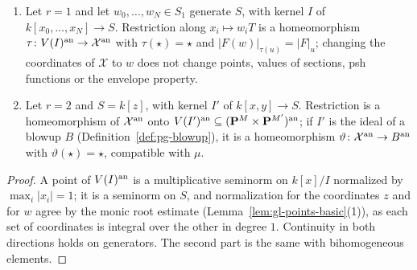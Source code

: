 \begin{lemma}\label{lem:gl-bridge-points}
\leanok
{}
\begin{enumerate}
\item Let $r=1$ and let $w_0,\dots,w_N\in S_1$ generate $S$, with kernel $I$ of $k[x_0,\dots,x_N]\to S$. Restriction along $x_i\mapsto w_iT$ is a
homeomorphism $\tau\colon V(I)^{\mathrm{an}}\to\mathcal X^{\mathrm{an}}$ with $\tau(\star)=\star$ and $|F(w)|_{\tau(u)}=|F|_u$; changing the coordinates of $\mathcal X$ to
$w$ does not change points, values of sections, psh functions or the envelope property.
\item Let $r=2$ and $S=k[z]$, with kernel $I'$ of $k[x,y]\to S$. Restriction is a homeomorphism of $\mathcal X^{\mathrm{an}}$ onto $V(I')^{\mathrm{an}}\subseteq
(\mathbf{P}^M\times\mathbf{P}^{M'})^{\mathrm{an}}$; if $I'$ is the ideal of a blowup $B$ (Definition~\ref{def:pg-blowup}), it is a homeomorphism $\vartheta\colon
\mathcal X^{\mathrm{an}}\to B^{\mathrm{an}}$ with $\vartheta(\star)=\star$, compatible with $\mu$.
\end{enumerate}
\end{lemma}

\begin{proof}
A point of $V(I)^{\mathrm{an}}$ is a multiplicative seminorm on $k[x]/I$ normalized by $\max_i|x_i|=1$; it is a seminorm on $S$, and normalization for the
coordinates $z$ and for $w$ agree by the monic root estimate (Lemma~\ref{lem:gl-points-basic}(1)), as each set of coordinates is integral over the
other in degree $1$. Continuity in both directions holds on generators. The second part is the same with bihomogeneous elements.
\end{proof}

